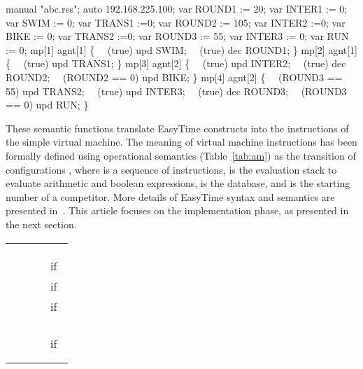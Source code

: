 \documentclass[preprint, prX]{revtex4}
\begin{document}
\begin{algorithm}[htb]
\caption{EasyTime program for measuring time in a triathlon competition as illustrated in Fig.~\ref{pic:slika_1}}
\label{alg:prog}
\scriptsize
\begin{algorithmic}[1]
 manual "abc.res";
 auto 192.168.225.100;
\STATE
\STATE var ROUND1 := 20;
\STATE var INTER1 := 0;
\STATE var SWIM := 0;
\STATE var TRANS1 :=0;
\STATE var ROUND2 := 105;
\STATE var INTER2 :=0;
\STATE var BIKE := 0;
\STATE var TRANS2 :=0;
\STATE var ROUND3 := 55;
\STATE var INTER3 := 0;
\STATE var RUN := 0;
\STATE
\STATE mp[1]  agnt[1] \{
\STATE \ \ (true)  upd SWIM;
\STATE \ \ (true)  dec ROUND1;
\STATE \}
\STATE mp[2]  agnt[1] \{
\STATE \ \ (true)   upd TRANS1;
\STATE \}
\STATE mp[3]   agnt[2] \{
\STATE \ \ (true)   upd INTER2;
\STATE \ \ (true)   dec ROUND2;
\STATE \ \ (ROUND2 == 0)   upd BIKE;
\STATE \}
\STATE mp[4]   agnt[2] \{
\STATE \ \ (ROUND3 == 55)   upd TRANS2;
\STATE \ \ (true)   upd INTER3;
\STATE \ \ (true)   dec ROUND3;
\STATE \ \ (ROUND3 == 0)   upd RUN;
\STATE \}
\end{algorithmic}
\normalsize
\end{algorithm}


These semantic functions translate EasyTime constructs into the instructions of the simple virtual machine. The meaning of virtual machine instructions has been formally defined using operational semantics (Table~\ref{tab:am}) as the transition of configurations , where  is a sequence of instructions,  is the evaluation stack to evaluate arithmetic and boolean expressions,  is the database, and  is the starting number of a competitor. More details of EasyTime syntax and semantics are presented in~\cite{Fister:2011}. This article focuses on the implementation phase, as presented in the next section.


\begin{table*}[htb]       \caption{The virtual machine specification}
\label{tab:am}
\begin{center}
\vspace{-5mm}
\scriptsize
\begin{tabular}{ | l  l  l  l | }
\hline
   &  &  & \\
   &  &  & \\
   &  &  & \\
   &  &  & \textnormal{\ if}\  \\
   &  &  & \textnormal{\ if}\  \\
   &  &  & \textnormal{\ if}\  \\
   &  &  & \\
   &  &  & \\
   &  &  & \\
   &  &  & \\
   &  &  & \textnormal{\ if}\  \\
   &  &  & \\
   &  &   &  \\
\hline
\end{tabular}
\normalsize
\vspace{-5mm}
\end{center}
\end{table*}
\end{document}
